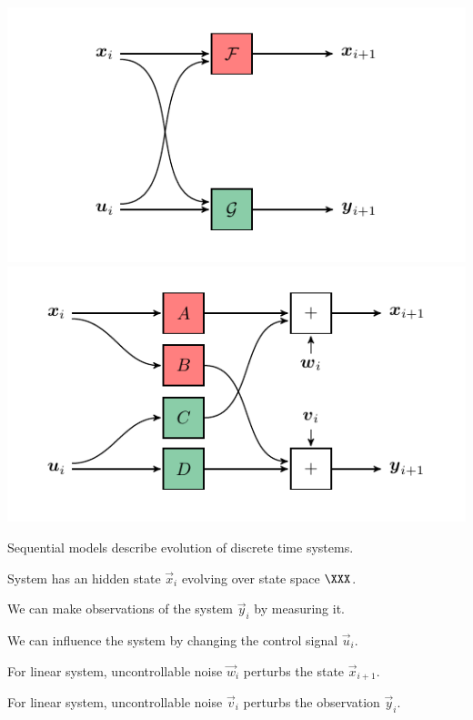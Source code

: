 \documentclass[landscape,footrule]{foils}
\begin{document}
\titlefoil


\centerline{
\includegraphics[scale=1.2]{nonlinear-control}
\includegraphics[scale=1.2]{linear-control}\hspace*{1cm}
}

Sequential models describe evolution of discrete time systems.
\begin{triangles}
\item System has an hidden state $\vec{x}_i$ evolving over state space $\XXX$.
\item We can make observations of the system $\vec{y}_i$ by measuring it.
\item We can influence the system by changing the control signal $\vec{u}_i$.
\item For linear system, uncontrollable noise $\vec{w}_i$ perturbs the state $\vec{x}_{i+1}$.  
\item For linear system, uncontrollable noise $\vec{v}_i$ perturbs the observation $\vec{y}_{i}$.  

\end{triangles}
\end{document}
